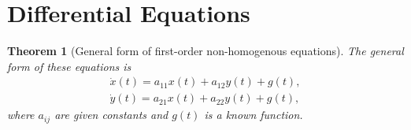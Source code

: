 \documentclass{article}
\newtheorem{theorem}{Theorem}
\theoremstyle{definition}
\theoremstyle{Solution}
\begin{document}
\section{Differential Equations}

\begin{theorem}[General form of first-order non-homogenous equations]
The general form of these equations is
\begin{equation}
	\begin{aligned}
		\dot{x}(t)=a_{11}x(t)+a_{12}y(t)+g(t), \\
		\dot{y}(t)=a_{21}x(t)+a_{22}y(t)+g(t),
	\end{aligned}
\end{equation}
where $a_{ij}$ are given constants and $g(t)$ is a known function.
\end{theorem}
\end{document}
